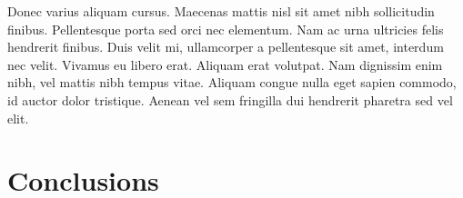 \documentclass[sigconf]{acmart} %
\begin{document}
Donec varius aliquam cursus. Maecenas mattis nisl sit amet nibh sollicitudin finibus. Pellentesque porta sed orci nec elementum. Nam ac urna ultricies felis hendrerit finibus. Duis velit mi, ullamcorper a pellentesque sit amet, interdum nec velit. Vivamus eu libero erat. Aliquam erat volutpat. Nam dignissim enim nibh, vel mattis nibh tempus vitae. Aliquam congue nulla eget sapien commodo, id auctor dolor tristique. Aenean vel sem fringilla dui hendrerit pharetra sed vel elit.




\section{Conclusions}
\end{document}
